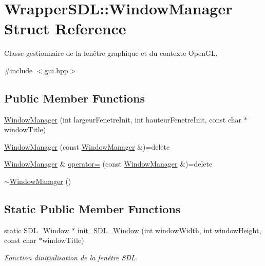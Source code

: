 \hypertarget{struct_wrapper_s_d_l_1_1_window_manager}{}\section{Wrapper\+S\+DL\+:\+:Window\+Manager Struct Reference}
\label{struct_wrapper_s_d_l_1_1_window_manager}


Classe gestionnaire de la fenêtre graphique et du contexte Open\+GL.  




{\ttfamily \#include $<$gui.\+hpp$>$}

\subsection*{Public Member Functions}
\begin{DoxyCompactItemize}
\item 
\hyperlink{struct_wrapper_s_d_l_1_1_window_manager_ae02139a68c12d56782e1293c3c0f859a}{Window\+Manager} (int largeur\+Fenetre\+Init, int hauteur\+Fenetre\+Init, const char $\ast$window\+Title)
\item 
\hyperlink{struct_wrapper_s_d_l_1_1_window_manager_aecb08757241e2d17ac5381f9596851c3}{Window\+Manager} (const \hyperlink{struct_wrapper_s_d_l_1_1_window_manager}{Window\+Manager} \&)=delete
\item 
\hyperlink{struct_wrapper_s_d_l_1_1_window_manager}{Window\+Manager} \& \hyperlink{struct_wrapper_s_d_l_1_1_window_manager_ad6084e2189751023bfc18927891dedad}{operator=} (const \hyperlink{struct_wrapper_s_d_l_1_1_window_manager}{Window\+Manager} \&)=delete
\item 
\hyperlink{struct_wrapper_s_d_l_1_1_window_manager_a7d586fdd6fffdaa093efe52a31a4c9f6}{$\sim$\+Window\+Manager} ()
\end{DoxyCompactItemize}
\subsection*{Static Public Member Functions}
\begin{DoxyCompactItemize}
\item 
static S\+D\+L\+\_\+\+Window $\ast$ \hyperlink{struct_wrapper_s_d_l_1_1_window_manager_a04c1b0e8c5c9b685863f60d2d033fcb5}{init\+\_\+\+S\+D\+L\+\_\+\+Window} (int window\+Width, int window\+Height, const char $\ast$window\+Title)
\begin{DoxyCompactList}\small\item\em Fonction d\textquotesingle{}initialisation de la fenêtre S\+DL. \end{DoxyCompactList}\end{DoxyCompactItemize}
